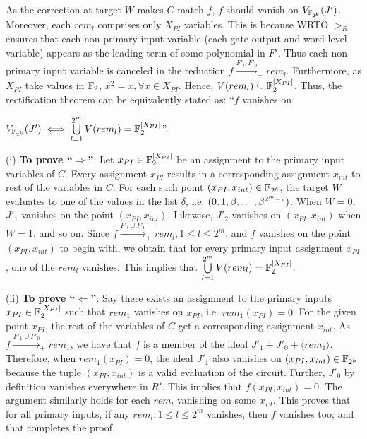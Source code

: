 {\red
\begin{Proof}
As the correction at target $W$ makes $C$ match $f$, $f$ should vanish on
$V_{{\mathbb{F}}_{2^k}}(J')$.
Moreover, each $rem_l$ comprises only $X_{PI}$ variables. This is
because WRTO $>_R$ ensures that each non primary input variable (each gate
output and  word-level variable) appears as the leading term of some
polynomial in $F'$. Thus each non primary input variable is canceled
in the reduction $f\xrightarrow{F'_l, F'_{0}}_+ rem_l$. Furthermore,
as $X_{PI}$ take values in ${\mathbb{F}}_2$, $x^2=x, \forall x \in
X_{PI}$. Hence, 
$V(rem_l) \subseteq {\mathbb{F}}_{2}^{|X_{PI}|}$. Thus, the rectification theorem
 can be equivalently stated as: ``$f$ vanishes on
\begin{small}
$V_{{\mathbb{F}}_{2^k}}(J') \iff \bigcup\limits_{l=1}^{2^m}V(rem_l) = {\mathbb{F}}_{2}^{|X_{PI}|}$''.
\end{small} 

(i) {\bf To prove ``$\Rightarrow$''}: Let $x_{PI} \in {\mathbb{F}}_{2}^{|X_{PI}|}$ be an
assignment to the primary input variables of $C$. Every assignment
$x_{PI}$ results in a corresponding assignment $x_{int}$ 
to rest of the variables in $C$. For each such point $(x_{PI},x_{int})\in {\mathbb{F}}_{2^k}$,
the target $W$ evaluates to one of the values in the list $\delta$,
i.e. $(0,1,\beta,\dots,\beta^{2^m-2})$. When $W = 0$, $J'_1$ vanishes on
the point $(x_{PI},x_{int})$. Likewise, $J'_2$ vanishes on
$(x_{PI},x_{int})$ when $W = 1$, and so on. Since
$f\xrightarrow{F'_l\cup F'_0}_+rem_l,1 \leq l \leq 2^m$, and $f$ vanishes
on the point $(x_{PI},x_{int})$ to begin with, we obtain that for
every  primary input assignment $x_{PI}$, one of the $rem_l$ vanishes. This
implies that $ \bigcup\limits_{l=1}^{2^m}V(rem_l) = {\mathbb{F}}_{2}^{|X_{PI}|}$.

(ii) {\bf To prove ``$\Leftarrow$''}: Say there exists an assignment to the
primary inputs $x_{PI} \in {\mathbb{F}}_{2}^{|X_{PI}|}$ such that $rem_1$ vanishes on
$x_{PI}$, i.e. $rem_1(x_{PI})=0$. For the given point $x_{PI}$, the rest of the variables 
of $C$ get a corresponding assignment $x_{int}$. 
As $f\xrightarrow{F'_1\cup F'_0}_+ rem_1$, we have that $f$ is a member of the
ideal $J'_1 + J'_0 + \langle rem_1 \rangle$. Therefore, when
$rem_1(x_{PI})=0$, the ideal $J'_1$ also vanishes on $(x_{PI},x_{int}) \in {\mathbb{F}}_{2^k}$
because the tuple $(x_{PI},x_{int})$ is a valid evaluation of the circuit.
Further, $J'_0$ by definition vanishes everywhere in $R'$. This implies that
$f(x_{PI},x_{int})=0$. The argument similarly holds for each
$rem_{l}$ vanishing on some $x_{PI}$. This proves that for all primary
inputs, if any $rem_l:1 \leq l \leq 2^m$ vanishes, then $f$ vanishes too; and 
that completes the proof.
\end{Proof}
 }

